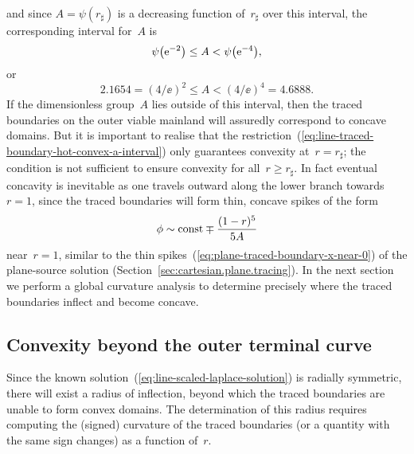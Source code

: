 and since $A = \psi (r_\sharp)$ is a decreasing function of~$r_\sharp$
over this interval,
the corresponding interval for~$A$ is
\[
  \psi \roundbr*{\ee^{-2}} \le A < \psi \roundbr*{\ee^{-4}},
\]
or
\begin{equation}
  2.1654 = (4 / \ee)^2 \le A < (4 / \ee)^4 = 4.6888.
  \label{eq:line-traced-boundary-hot-convex-a-interval}
\end{equation}
If the dimensionless group~$A$ lies outside of this interval,
then the traced boundaries on the outer viable mainland
will assuredly correspond to concave domains.
But it is important to realise that
the restriction~(\ref{eq:line-traced-boundary-hot-convex-a-interval})
only guarantees convexity at~$r = r_\sharp$;
the condition is not sufficient to ensure convexity for all~$r \ge r_\sharp$.
In fact eventual concavity is inevitable
as one travels outward along the lower branch towards~$r = 1$,
since the traced boundaries will form thin, concave spikes of the form
\begin{equation}
  \phi \sim \mathrm{const} \mp \frac{(1 - r)^5}{5 A}
  \label{eq:line-traced-boundary-r-near-1}
\end{equation}
near~$r = 1$,
similar to the thin spikes~(\ref{eq:plane-traced-boundary-x-near-0})
of the plane-source solution (Section~\ref{sec:cartesian.plane.tracing}).
In the next section we perform a global curvature analysis
to determine precisely where the traced boundaries inflect
and become concave.

\subsection{Convexity beyond the outer terminal curve}
\label{sec:polar.convex.beyond}

Since the known solution~(\ref{eq:line-scaled-laplace-solution})
is radially symmetric,
there will exist a radius of inflection,
beyond which the traced boundaries are unable to form convex domains.
The determination of this radius requires
computing the (signed) curvature of the traced boundaries
(or a quantity with the same sign changes)
as a function of~$r$.

